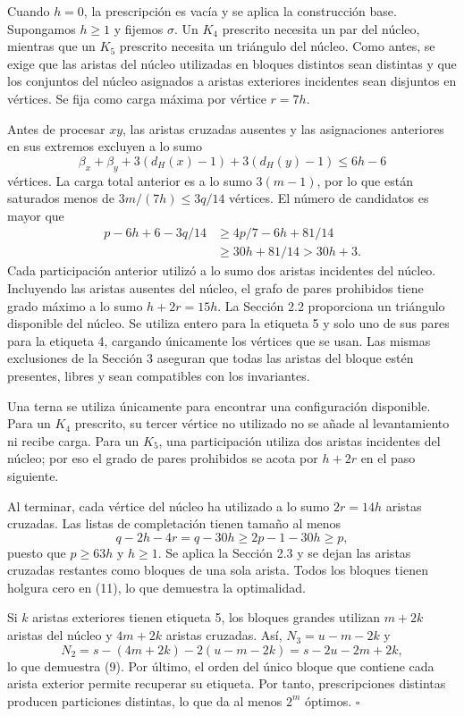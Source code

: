 \documentclass[spanish,11pt,a4paper]{article}
\begin{document}
Cuando \(h=0\), la prescripción es vacía y se aplica la construcción
base. Supongamos \(h\ge1\) y fijemos \(\sigma\). Un \(K_4\) prescrito
necesita un par del núcleo, mientras que un \(K_5\) prescrito necesita
un triángulo del núcleo. Como antes, se exige que las aristas del núcleo
utilizadas en bloques distintos sean distintas y que los conjuntos del
núcleo asignados a aristas exteriores incidentes sean disjuntos en
vértices. Se fija como carga máxima por vértice \(r=7h\).

Antes de procesar \(xy\), las aristas cruzadas ausentes y las
asignaciones anteriores en sus extremos excluyen a lo sumo \[
\beta_x+\beta_y+3(d_H(x)-1)+3(d_H(y)-1)\le6h-6
\] vértices. La carga total anterior es a lo sumo \(3(m-1)\), por lo que
están saturados menos de \(3m/(7h)\le3q/14\) vértices. El número de
candidatos es mayor que \[
\begin{aligned}
p-6h+6-3q/14
&\ge4p/7-6h+81/14\\
&\ge30h+81/14>30h+3.
\end{aligned} \tag{19}
\] Cada participación anterior utilizó a lo sumo dos aristas incidentes
del núcleo. Incluyendo las aristas ausentes del núcleo, el grafo de
pares prohibidos tiene grado máximo a lo sumo \(h+2r=15h\). La Sección
2.2 proporciona un triángulo disponible del núcleo. Se utiliza entero
para la etiqueta 5 y solo uno de sus pares para la etiqueta 4, cargando
únicamente los vértices que se usan. Las mismas exclusiones de la
Sección 3 aseguran que todas las aristas del bloque estén presentes,
libres y sean compatibles con los invariantes.

Una terna se utiliza únicamente para encontrar una configuración
disponible. Para un \(K_4\) prescrito, su tercer vértice no utilizado no
se añade al levantamiento ni recibe carga. Para un \(K_5\), una
participación utiliza dos aristas incidentes del núcleo; por eso el
grado de pares prohibidos se acota por \(h+2r\) en el paso siguiente.

Al terminar, cada vértice del núcleo ha utilizado a lo sumo \(2r=14h\)
aristas cruzadas. Las listas de completación tienen tamaño al menos \[
q-2h-4r=q-30h\ge2p-1-30h\ge p,
\] puesto que \(p\ge63h\) y \(h\ge1\). Se aplica la Sección 2.3 y se
dejan las aristas cruzadas restantes como bloques de una sola arista.
Todos los bloques tienen holgura cero en (11), lo que demuestra la
optimalidad.

Si \(k\) aristas exteriores tienen etiqueta 5, los bloques grandes
utilizan \(m+2k\) aristas del núcleo y \(4m+2k\) aristas cruzadas. Así,
\(N_3=u-m-2k\) y \[
N_2=s-(4m+2k)-2(u-m-2k)=s-2u-2m+2k,
\] lo que demuestra (9). Por último, el orden del único bloque que
contiene cada arista exterior permite recuperar su etiqueta. Por tanto,
prescripciones distintas producen particiones distintas, lo que da al
menos \(2^m\) óptimos. \(\square\)
\end{document}
